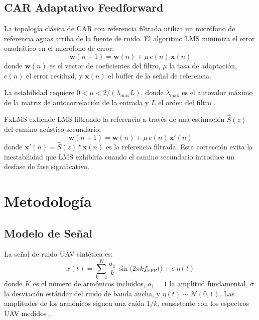 \documentclass[journal,12pt,onecolumn]{IEEEtran}
\begin{document}
\subsection{CAR Adaptativo Feedforward}

La topología clásica de CAR con referencia filtrada \cite{kuo1999} utiliza
un micrófono de referencia aguas arriba de la fuente de ruido.
El algoritmo LMS minimiza el error cuadrático en el micrófono de error:
\begin{equation}
  \bm{w}(n+1) = \bm{w}(n) + \mu\,e(n)\,\bm{x}(n)
  \label{eq:lms}
\end{equation}
donde $\bm{w}(n)$ es el vector de coeficientes del filtro, $\mu$ la tasa
de adaptación, $e(n)$ el error residual, y $\bm{x}(n)$ el buffer de la
señal de referencia.

La estabilidad requiere $0 < \mu < 2/(\lambda_{\max} L)$, donde
$\lambda_{\max}$ es el autovalor máximo de la matriz de autocorrelación
de la entrada y $L$ el orden del filtro \cite{widrow1985}.

FxLMS \cite{kuo1996} extiende LMS filtrando la referencia a través de
una estimación $\hat{S}(z)$ del camino acústico secundario:
\begin{equation}
  \bm{w}(n+1) = \bm{w}(n) + \mu\,e(n)\,\bm{x}'(n)
  \label{eq:fxlms}
\end{equation}
donde $\bm{x}'(n) = \hat{S}(z) * \bm{x}(n)$ es la referencia filtrada.
Esta corrección evita la inestabilidad que LMS exhibiría cuando el camino
secundario introduce un desfase de fase significativo.

\section{Metodología}
\label{sec:methodology}

\subsection{Modelo de Señal}

La señal de ruido UAV sintética es:
\begin{equation}
  x(t) = \sum_{k=1}^{K} \frac{a_1}{k}\,\sin\!\bigl(2\pi k f_{\text{FPP}} t\bigr)
         + \sigma\,\eta(t)
  \label{eq:signal}
\end{equation}
donde $K$ es el número de armónicos incluidos, $a_1=1$ la amplitud
fundamental, $\sigma$ la desviación estándar del ruido de banda ancha,
y $\eta(t)\sim\mathcal{N}(0,1)$.
Las amplitudes de los armónicos siguen una caída $1/k$, consistente con
los espectros UAV medidos \cite{torija2022}.
\end{document}
